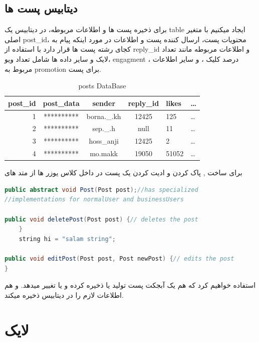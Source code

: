 \documentclass[12pt]{article}
\begin{document}
\subsection{دیتابیس پست ها}
برای ذخیره پست ها و  اطلاعات مربوطه، در دیتابیس یک table
ایجاد میکنیم با متغیر اصلی post\_id،
محتویات پست، ارسال کننده پست و اطلاعات در مورد اینکه پیام به
کجای رشته پست ها قرار دارد با استفاده از reply\_id
و اطلاعات مربوطه مانند تعداد لایک و سایر داده ها
شامل تعداد ویو، engagment ، درصد کلیک ، و سایر اطلاعات مربوط
به promotion برای پست.
\begin{latin}
    \begin{table}[h]
        \centering
        \begin{tabular}{|r|c|c|c|l|l|}
            \hline
            post\_id & post\_data & sender      & reply\_id & likes & \dots \\
            \hline
            1        & ********** & borna.\_.kh & 12425     & 125   & \dots \\
            2        & ********** & sep.\_.h    & null      & 11    & \dots \\
            3        & ********** & hoss\_anji  & 12425     & 2     & \dots \\
            4        & ********** & mo.makk     & 19050     & 51052 & \dots \\
            \hline
        \end{tabular}
        \caption{posts DataBase}
    \end{table}
\end{latin}
برای ساخت , پاک کردن و ادیت کردن یک پست در داخل کلاس یوزر ها از متد های
\begin{latin}
    \begin{lstlisting}[language=Java, caption={Post class},label={lst:code}, mathescape=true, breaklines=true]
public abstract void Post(Post post);//has specialized 
//implementations for normalUser and businessUsers

public void deletePost(Post post) {// deletes the post
    }
    string hi = "salam string";

public void editPost(Post post, Post newPost) {// edits the post
}
    \end{lstlisting}
\end{latin}
استفاده خواهیم کرد که هم یک آبجکت پست تولید یا ذخیره کرده
و یا تغییر میدهد.
و هم اطلاعات لازم را در دیتابیس ذخیره میکند.\\
\pagebreak

\section{لایک}
\end{document}
